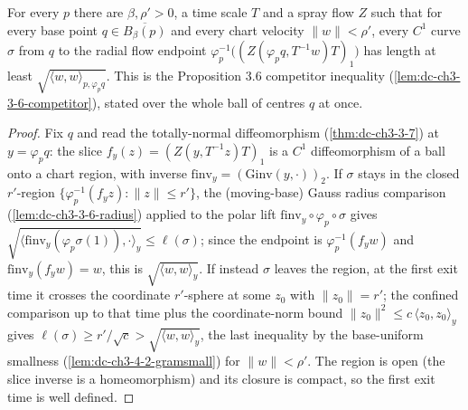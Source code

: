 \begin{lemma}
  \label{lem:dc-ch3-4-2-competitor-lb}


  For every $p$ there are $\beta,\rho'>0$, a time scale $T$ and a spray flow $Z$ such that for every
  base point $q\in\overline{B_\beta(p)}$ and every chart velocity $\|w\|<\rho'$, every $C^1$ curve
  $\sigma$ from $q$ to the radial flow endpoint $\varphi_p^{-1}\big((Z(\varphi_p q,T^{-1}w)T)_1\big)$
  has length at least $\sqrt{\langle w,w\rangle_{p,\varphi_p q}}$. This is the Proposition 3.6
  competitor inequality (\cref{lem:dc-ch3-3-6-competitor}), stated over the whole ball of centres $q$
  at once.
\end{lemma}
\begin{proof}
  \sketch

  Fix $q$ and read the totally-normal diffeomorphism (\cref{thm:dc-ch3-3-7}) at $y=\varphi_p q$: the
  slice $f_y(z)=(Z(y,T^{-1}z)T)_1$ is a $C^1$ diffeomorphism of a ball onto a chart region, with
  inverse $\mathrm{finv}_y=(\mathrm{Ginv}(y,\cdot))_2$. If $\sigma$ stays in the closed $r'$-region
  $\{\varphi_p^{-1}(f_y z):\|z\|\le r'\}$, the (moving-base) Gauss radius comparison
  (\cref{lem:dc-ch3-3-6-radius}) applied to the polar lift $\mathrm{finv}_y\circ\varphi_p\circ\sigma$
  gives $\sqrt{\langle\mathrm{finv}_y(\varphi_p\sigma(1)),\cdot\rangle_y}\le\ell(\sigma)$; since the
  endpoint is $\varphi_p^{-1}(f_y w)$ and $\mathrm{finv}_y(f_y w)=w$, this is
  $\sqrt{\langle w,w\rangle_y}$. If instead $\sigma$ leaves the region, at the first exit time it
  crosses the coordinate $r'$-sphere at some $z_0$ with $\|z_0\|=r'$; the confined comparison up to
  that time plus the coordinate-norm bound $\|z_0\|^2\le c\,\langle z_0,z_0\rangle_y$ gives
  $\ell(\sigma)\ge r'/\sqrt c>\sqrt{\langle w,w\rangle_y}$, the last inequality by the base-uniform
  smallness (\cref{lem:dc-ch3-4-2-gramsmall}) for $\|w\|<\rho'$. The region is open (the slice inverse
  is a homeomorphism) and its closure is compact, so the first exit time is well defined.
\end{proof}

